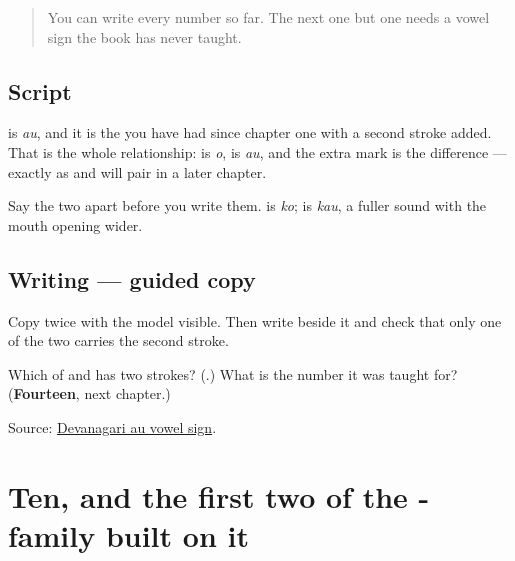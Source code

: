 \label{lesson:MR-W56-au-matra}



\begin{quote}
You can write every number so far. The next one but one needs a vowel sign the book has never taught.
\end{quote}

\subsection*{Script}
\begin{quote}
\end{quote}

\textbf{} is \emph{au}, and it is the \textbf{} you have had since chapter one with a second stroke added. That is the whole relationship: \textbf{} is \emph{o}, \textbf{} is \emph{au}, and the extra mark is the difference — exactly as \textbf{} and \textbf{} will pair in a later chapter.

Say the two apart before you write them. \textbf{} is \emph{ko}; \textbf{} is \emph{kau}, a fuller sound with the mouth opening wider.

\subsection*{Writing — guided copy}
Copy \textbf{} twice with the model visible. Then write \textbf{} beside it and check that only one of the two carries the second stroke.

\begin{tcolorbox}[breakable,colback=teal!4,colframe=teal!35!black,title={Before you move on}]
Which of \textbf{} and \textbf{} has two strokes? (\textbf{}.) What is the number it was taught for? (\textbf{Fourteen}, next chapter.)

Source: \href{https://en.wiktionary.org/wiki/\%E0\%A5\%8C}{Devanagari au vowel sign}.
\end{tcolorbox}
\section[\texorpdfstring{\mr{दहा} · \mr{अकरा} · \mr{बारा} (dahā · akrā · bārā)}{दहा · अकरा · बारा (dahā · akrā · bārā)}]{Ten, and the first two of the - family built on it}

\label{lesson:MR-R56-ten-to-twelve}



